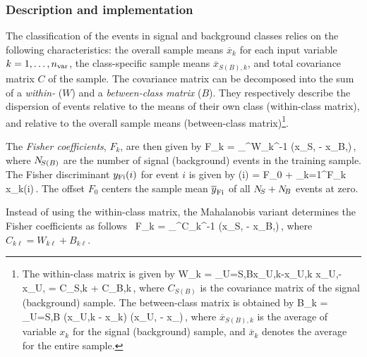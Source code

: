 \subsubsection{Description and implementation}

The classification of the events in signal and background classes relies 
on the following characteristics: the overall sample means $\overline x_k$
for each input variable $k=1,\dots,{n_\text{var}}$, the class-specific sample means
$\overline x_{S(B),k}$, and total covariance matrix $C$ of the 
sample. The covariance matrix can be decomposed into the sum of a {\em within-}
($W$) and a {\em between-class matrix} ($B$). They respectively describe 
the dispersion of events relative to the means of their own 
class (within-class matrix), and relative to the overall sample means 
(between-class matrix)\footnote
{
	The within-class matrix is given by
	\beqns
		W_{k\ell} = \sum_{U=S,B}\langle x_{U,k}-\overline x_{U,k}\rangle
                                \langle x_{U,\ell}-\overline x_{U,\ell}\rangle
					 = C_{S,k\ell} + C_{B,k\ell}\,,
	\eeqns
	where $C_{S(B)}$ is the covariance matrix of the signal (background)
	sample. The between-class matrix is obtained by
	\beqns
		B_{k\ell} = \sum_{U=S,B}
                  \left(\overline x_{U,k} - \overline x_{k}\right)
                  \left(\overline x_{U,\ell} - \overline x_{\ell}\right)\,,
	\eeqns
	where $\overline x_{S(B),k}$ is the average of variable $x_{k}$ for the 
   signal (background) sample, and $\overline x_{k}$ denotes the average for 
   the entire sample.
}. 

The {\em Fisher coefficients}, $F_k$, are then given by 
\beq
\label{eq:Fisher}
	F_k = \frac{\sqrt{\NS \NB}}{\NS+\NB}
		   \sum_{}^{\Nvar}W_{k\ell}^{-1}
         \left(\overline x_{S,\ell} - \overline x_{B,\ell}\right)\,,
\eeq
where $ N_{\!S(B)}$ are the number of signal (background) events in the 
training sample. The Fisher discriminant $y_\text{Fi}(i)$ for event $i$ 
is given by
\beq
	\Fisher(i) = F_0 + \sum_{k=1}^{\Nvar}F_k x_k(i)\,.
\eeq
The offset $F_0$ centers the sample mean $ \overline y_\text{Fi}$ of
all $ N_{\!S}+ N_{\!B}$ events at zero. 

Instead of using the within-class matrix, the Mahalanobis 
variant determines the Fisher coefficients as follows~\cite{Mahalanobis}
\beq
\label{eq:Mahalanobis}
	F_k = \frac{\sqrt{\NS \NB}}{\NS+\NB}
		   \sum_{}^{\Nvar}C_{k\ell}^{-1}
         \left(\overline x_{S,\ell} - \overline x_{B,\ell}\right)\,,
\eeq
where $C_{k\ell}=W_{k\ell}+B_{k\ell}$.


